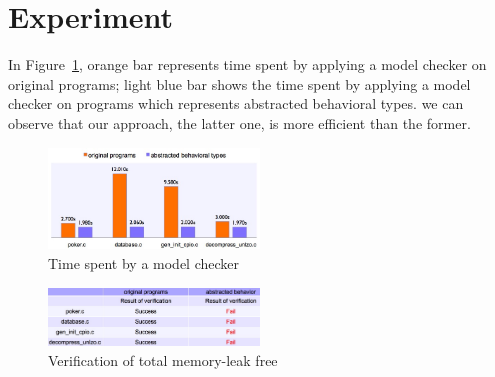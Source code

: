 \documentclass{sigplanconf}
\begin{document}
\section{Experiment}
In Figure~\ref{figcomp}, orange bar represents time spent by applying
a model checker on original programs; light blue bar shows the time
spent by applying a model checker on programs which represents
abstracted behavioral types.  we can observe that our approach, the
latter one, is more efficient than the former.
\begin{figure}[!hbp] 
\centering 
\includegraphics[width=0.5\textwidth]{comp.png} 
\caption{Time spent by a model checker}\label{figcomp} 
\end{figure}

\begin{figure}[!hbp] 
\centering 
\includegraphics[width=0.5\textwidth]{exp.png} 
\caption{Verification of total memory-leak free}\label{figexp} 
\end{figure}

\end{document}
